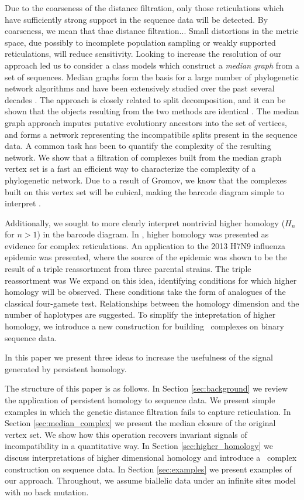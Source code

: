 Due to the coarseness of the distance filtration, only those reticulations which have sufficiently strong support in the sequence data will be detected.
By coarseness, we mean that thae distance filtration...
Small distortions in the metric space, due possibly to incomplete population sampling or weakly supported reticulations, will reduce sensitivity.
Looking to increase the resolution of our approach led us to consider a class models which construct a \emph{median graph} from a set of sequences.
Median graphs form the basis for a large number of phylogenetic network algorithms and have been extensively studied over the past several decades \autocite{Bandelt:1999}.
The approach is closely related to split decomposition, and it can be shown that the objects resulting from the two methods are identical \autocite{Bandelt:1992}.
The median graph approach imputes putative evolutionry ancestors into the set of vertices, and forms a network representing the incompatibile splits present in the sequence data.
A common task has been to quantify the complexity of the resulting network.
We show that a filtration of complexes built from the median graph vertex set is a fast an efficient way to characterize the complexity of a phylogenetic network.
Due to a result of Gromov, we know that the complexes built on this vertex set will be cubical, making the barcode diagram simple to interpret \citet{Gromov:1987}.

Additionally, we sought to more clearly interpret nontrivial higher homology ($H_{n}$ for $n>1$) in the barcode diagram.
In \citet{Chan:2013}, higher homology was presented as evidence for complex reticulations.
An application to the 2013 H7N9 influenza epidemic was presented, where the source of the epidemic was shown to be the result of a triple reassortment from three parental strains.
The triple reassortment was 
We expand on this idea, identifying conditions for which higher homology will be observed.
These conditions take the form of analogues of the classical four-gamete test.
Relationships between the homology dimension and the number of haplotypes are suggested.
To simplify the intepretation of higher homology, we introduce a new construction for building \Cech\ complexes on binary sequence data.

In this paper we present three ideas to increase the usefulness of the signal generated by persistent homology.

The structure of this paper is as follows.
In Section \ref{sec:background} we review the application of persistent homology to sequence data.
We present simple examples in which the genetic distance filtration fails to capture reticulation.
In Section \ref{sec:median_complex} we present the median closure of the original vertex set.
We show how this operation recovers invariant signals of incompatibility in a quantitative way.
In Section \ref{sec:higher_homology} we discuss interpretations of higher dimensional homology and introduce a \Cech\ complex construction on sequence data.
In Section \ref{sec:examples} we present examples of our approach.
Throughout, we assume biallelic data under an infinite sites model with no back mutation.

